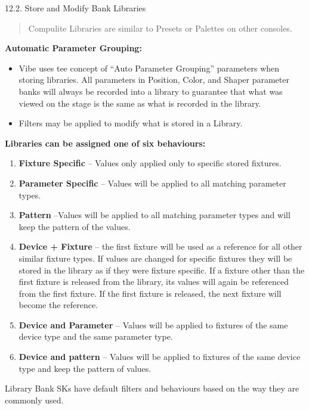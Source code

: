\documentclass[
]{article}
\begin{document}
12.2. Store and Modify Bank Libraries

\begin{quote}
Compulite Libraries are similar to Presets or Palettes on other consoles.
\end{quote}

\textbf{Automatic Parameter Grouping:}

\begin{itemize}
\item
  Vibe uses tee concept of ``Auto Parameter Grouping'' parameters when storing libraries. All parameters in Position, Color, and Shaper parameter banks will always be recorded into a library to guarantee that what was viewed on the stage is the same as what is recorded in the library.
\item
  Filters may be applied to modify what is stored in a Library.
\end{itemize}

\textbf{Libraries can be assigned one of six behaviours:}

\begin{enumerate}
\def\labelenumi{\arabic{enumi}.}
\item
  \textbf{Fixture Specific} -- Values only applied only to specific stored fixtures.
\item
  \textbf{Parameter Specific} -- Values will be applied to all matching parameter types.
\item
  \textbf{Pattern} --Values will be applied to all matching parameter types and will keep the pattern of the values.
\item
  \textbf{Device + Fixture} -- the first fixture will be used as a reference for all other similar fixture types. If values are changed for specific fixtures they will be stored in the library as if they were fixture specific. If a fixture other than the first fixture is released from the library, its values will again be referenced from the first fixture. If the first fixture is released, the next fixture will become the reference.
\item
  \textbf{Device and Parameter} -- Values will be applied to fixtures of the same device type and the same parameter type.
\item
  \textbf{Device and pattern} -- Values will be applied to fixtures of the same device type and keep the pattern of values.
\end{enumerate}

Library Bank SKs have default filters and behaviours based on the way they are commonly used.
\end{document}
